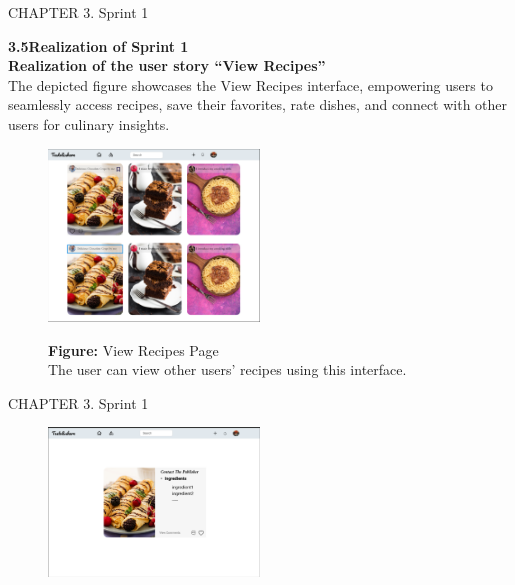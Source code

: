 \documentclass{article}
\begin{document}
{{{{{{{{%
\newpage
\noindent
CHAPTER 3.  Sprint 1 \\
\underline{\hspace{\textwidth}} \vspace{0.2cm}

{\Large \textbf{3.5\hspace{1em}Realization of Sprint 1}}\vspace{0.2cm}
\\\textbf{Realization of the user story “View Recipes”}\\
The depicted figure showcases the View Recipes interface, empowering users to seamlessly access recipes, save their favorites, rate dishes, and connect with other users for culinary insights.\\
\begin{figure}[htbp]
    \centering
    \includegraphics[width=0.5\textwidth]{ViewRecipes} 
    \vspace{0.5cm}
    
    \textbf{Figure:} View Recipes Page \\
    The user can view other users' recipes using this interface.
\end{figure}
\newpage
\noindent
CHAPTER 3.  Sprint 1 \\
\underline{\hspace{\textwidth}} \vspace{0.2cm}

\begin{figure}[htbp]
    \centering
    \includegraphics[width=0.5\textwidth]{ViewRecipes2} 
    \vspace{0.5cm}
    

\end{figure}}}}}}}}}
\end{document}
